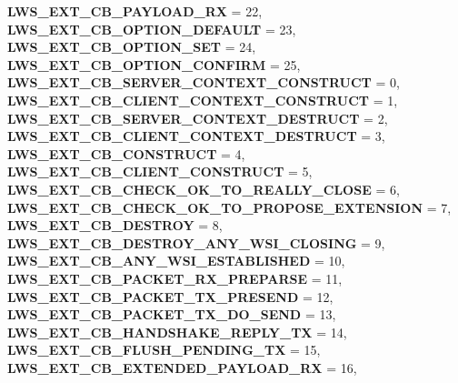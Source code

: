 \begin{DoxyCompactItemize}
{\bfseries L\+W\+S\+\_\+\+E\+X\+T\+\_\+\+C\+B\+\_\+\+P\+A\+Y\+L\+O\+A\+D\+\_\+\+RX} = 22, 
{\bfseries L\+W\+S\+\_\+\+E\+X\+T\+\_\+\+C\+B\+\_\+\+O\+P\+T\+I\+O\+N\+\_\+\+D\+E\+F\+A\+U\+LT} = 23, 
{\bfseries L\+W\+S\+\_\+\+E\+X\+T\+\_\+\+C\+B\+\_\+\+O\+P\+T\+I\+O\+N\+\_\+\+S\+ET} = 24, 
{\bfseries L\+W\+S\+\_\+\+E\+X\+T\+\_\+\+C\+B\+\_\+\+O\+P\+T\+I\+O\+N\+\_\+\+C\+O\+N\+F\+I\+RM} = 25, 
\newline
{\bfseries L\+W\+S\+\_\+\+E\+X\+T\+\_\+\+C\+B\+\_\+\+S\+E\+R\+V\+E\+R\+\_\+\+C\+O\+N\+T\+E\+X\+T\+\_\+\+C\+O\+N\+S\+T\+R\+U\+CT} = 0, 
{\bfseries L\+W\+S\+\_\+\+E\+X\+T\+\_\+\+C\+B\+\_\+\+C\+L\+I\+E\+N\+T\+\_\+\+C\+O\+N\+T\+E\+X\+T\+\_\+\+C\+O\+N\+S\+T\+R\+U\+CT} = 1, 
{\bfseries L\+W\+S\+\_\+\+E\+X\+T\+\_\+\+C\+B\+\_\+\+S\+E\+R\+V\+E\+R\+\_\+\+C\+O\+N\+T\+E\+X\+T\+\_\+\+D\+E\+S\+T\+R\+U\+CT} = 2, 
{\bfseries L\+W\+S\+\_\+\+E\+X\+T\+\_\+\+C\+B\+\_\+\+C\+L\+I\+E\+N\+T\+\_\+\+C\+O\+N\+T\+E\+X\+T\+\_\+\+D\+E\+S\+T\+R\+U\+CT} = 3, 
\newline
{\bfseries L\+W\+S\+\_\+\+E\+X\+T\+\_\+\+C\+B\+\_\+\+C\+O\+N\+S\+T\+R\+U\+CT} = 4, 
{\bfseries L\+W\+S\+\_\+\+E\+X\+T\+\_\+\+C\+B\+\_\+\+C\+L\+I\+E\+N\+T\+\_\+\+C\+O\+N\+S\+T\+R\+U\+CT} = 5, 
{\bfseries L\+W\+S\+\_\+\+E\+X\+T\+\_\+\+C\+B\+\_\+\+C\+H\+E\+C\+K\+\_\+\+O\+K\+\_\+\+T\+O\+\_\+\+R\+E\+A\+L\+L\+Y\+\_\+\+C\+L\+O\+SE} = 6, 
{\bfseries L\+W\+S\+\_\+\+E\+X\+T\+\_\+\+C\+B\+\_\+\+C\+H\+E\+C\+K\+\_\+\+O\+K\+\_\+\+T\+O\+\_\+\+P\+R\+O\+P\+O\+S\+E\+\_\+\+E\+X\+T\+E\+N\+S\+I\+ON} = 7, 
\newline
{\bfseries L\+W\+S\+\_\+\+E\+X\+T\+\_\+\+C\+B\+\_\+\+D\+E\+S\+T\+R\+OY} = 8, 
{\bfseries L\+W\+S\+\_\+\+E\+X\+T\+\_\+\+C\+B\+\_\+\+D\+E\+S\+T\+R\+O\+Y\+\_\+\+A\+N\+Y\+\_\+\+W\+S\+I\+\_\+\+C\+L\+O\+S\+I\+NG} = 9, 
{\bfseries L\+W\+S\+\_\+\+E\+X\+T\+\_\+\+C\+B\+\_\+\+A\+N\+Y\+\_\+\+W\+S\+I\+\_\+\+E\+S\+T\+A\+B\+L\+I\+S\+H\+ED} = 10, 
{\bfseries L\+W\+S\+\_\+\+E\+X\+T\+\_\+\+C\+B\+\_\+\+P\+A\+C\+K\+E\+T\+\_\+\+R\+X\+\_\+\+P\+R\+E\+P\+A\+R\+SE} = 11, 
\newline
{\bfseries L\+W\+S\+\_\+\+E\+X\+T\+\_\+\+C\+B\+\_\+\+P\+A\+C\+K\+E\+T\+\_\+\+T\+X\+\_\+\+P\+R\+E\+S\+E\+ND} = 12, 
{\bfseries L\+W\+S\+\_\+\+E\+X\+T\+\_\+\+C\+B\+\_\+\+P\+A\+C\+K\+E\+T\+\_\+\+T\+X\+\_\+\+D\+O\+\_\+\+S\+E\+ND} = 13, 
{\bfseries L\+W\+S\+\_\+\+E\+X\+T\+\_\+\+C\+B\+\_\+\+H\+A\+N\+D\+S\+H\+A\+K\+E\+\_\+\+R\+E\+P\+L\+Y\+\_\+\+TX} = 14, 
{\bfseries L\+W\+S\+\_\+\+E\+X\+T\+\_\+\+C\+B\+\_\+\+F\+L\+U\+S\+H\+\_\+\+P\+E\+N\+D\+I\+N\+G\+\_\+\+TX} = 15, 
\newline
{\bfseries L\+W\+S\+\_\+\+E\+X\+T\+\_\+\+C\+B\+\_\+\+E\+X\+T\+E\+N\+D\+E\+D\+\_\+\+P\+A\+Y\+L\+O\+A\+D\+\_\+\+RX} = 16, 

\end{DoxyCompactItemize}
